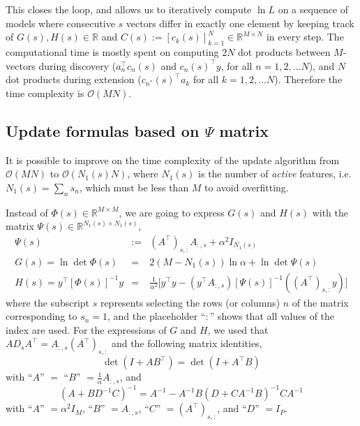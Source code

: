 \documentclass[letter,10pt,oneside]{article}
\newcommand{\be}{\begin{equation*}}
\newcommand{\ee}{\end{equation*}}
\newcommand{\ba}{\begin{eqnarray*}}
\newcommand{\ea}{\end{eqnarray*}}
\newcommand{\+}{^\dagger}
\newcommand{\s}{^\ast}
\newcommand{\T}{^\top}
\begin{document}
This closes the loop, and allows us to iteratively compute $\ln L$ on a sequence of models where consecutive  $s$ vectors differ in exactly one element by keeping track of $G(s), H(s)\in\mathds{R}$  and $C(s):=[c_k(s) ]_{k=1}^N \in \mathds{R}^{M\times N}$ in every step. 
The computational time is mostly spent on computing $2N$ dot products between $M$-vectors during discovery ($a_n\T c_n(s)$ and $c_n(s)\T y$, for all $n = 1, 2, \ldots N$), and $N$ dot products during extension ($c_{n\s}(s)\T a_k$ for all $k = 1, 2, \ldots N$). Therefore the time complexity is $\mathcal{O}(MN)$.


\subsection{Update formulas based on $\Psi$ matrix}
It is possible to improve on the time complexity of the update algorithm from $\mathcal{O}(MN)$ to $\mathcal{O}(N_1(s)N)$, where $N_1(s)$ is the number of \emph{active} features, i.e. $N_1(s) = \sum_{n} s_{n}$, which must be less than $M$ to avoid overfitting.

Instead of $\Phi(s) \in \mathds{R}^{M\times M}$, we are going to express $G(s)$ and $H(s)$ with the matrix $\Psi(s) \in \mathds{R}^{N_1(s)\times N_1(s)}$,
\ba
  \Psi(s) &:=& (A\T)_{s,:} A_{:,s} + \alpha^2 I_{N_1(s)} \\
  G(s) = \ln \det \Phi(s) &=& 2(M - N_1(s))\ln \alpha + \ln \det \Psi(s) \\
  H(s) = y\T [\Phi(s)]^{-1} y &=& \frac{1}{\alpha^2}\Big[y\T y - (y\T A_{:, s})[\Psi(s)]^{-1}((A\T)_{s,:} y)\Big] 
\ea
where the subscript $s$ represents selecting the rows (or columns) $n$ of the matrix corresponding to $s_n = 1$, and the placeholder ``$:$'' shows that all values of the index are used. For the expressions of $G$ and $H$, we used that $A D_s A\T = A_{:,s}(A\T)_{s,:}$ and the following matrix identities,
\be
  \det(I + AB\T) = \det(I + A\T B)
\ee
with ``$A$'' $=$ ``$B$'' $= \frac{1}{\alpha}A_{:,s}$, and
\be
  (A + BD^{-1}C)^{-1} = A^{-1} - A^{-1}B (D + CA^{-1}B)^{-1} C A^{-1}
\ee
with ``$A$'' $= \alpha^2 I_M$, ``$B$'' $= A_{:,s}$, ``$C$'' $= (A\T)_{s,:}$, and ``$D$'' $= I_P$.
\end{document}
